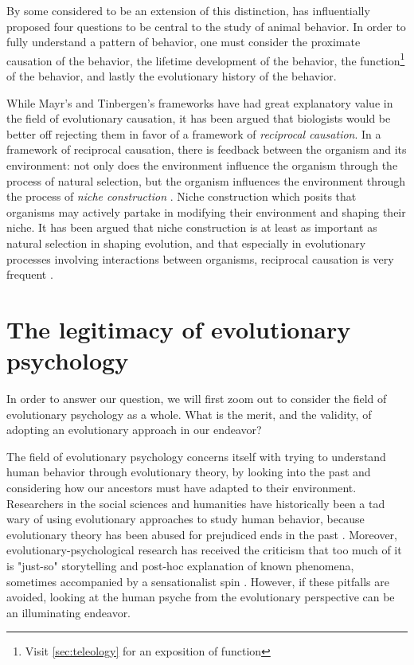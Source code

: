 By some considered to be an extension of this distinction, \cite{Tinbergen63} has influentially proposed four questions to be central to the study of animal behavior. In order to fully understand a pattern of behavior, one must consider the proximate causation of the behavior, the lifetime development of the behavior, the function\footnote{Visit \cref{sec:teleology} for an exposition of function} of the behavior, and lastly the evolutionary history of the behavior.

While Mayr's and Tinbergen's frameworks have had great explanatory value in the field of evolutionary causation, it has been argued \citep{Laland13} that biologists would be better off rejecting them in favor of a framework of \emph{reciprocal causation}.
In a framework of reciprocal causation, there is feedback between the organism and its environment: not only does the environment influence the organism through the process of natural selection, but the organism influences the environment through the process of \emph{niche construction} \citep{Svensson18}.
Niche construction which posits that organisms may actively partake in modifying their environment and shaping their niche. It has been argued that niche construction is at least as important as natural selection in shaping evolution, and that especially in evolutionary processes involving interactions between organisms, reciprocal causation is very frequent \citep{Svensson18}.

\section{The legitimacy of evolutionary psychology}

In order to answer our question, we will first zoom out to consider the field of evolutionary psychology as a whole. What is the merit, and the validity, of adopting an evolutionary approach in our endeavor?

The field of evolutionary psychology concerns itself with trying to understand human behavior through evolutionary theory, by looking into the past and considering how our ancestors must have adapted to their environment.
Researchers in the social sciences and humanities have historically been a tad wary of using evolutionary approaches to study human behavior, because evolutionary theory has been abused for prejudiced ends in the past \citep[pp.~19--20]{LB02}. Moreover, evolutionary-psychological research has received the criticism that too much of it is "just-so" storytelling and post-hoc explanation of known phenomena, sometimes accompanied by a sensationalist spin \citep{LB02}.
However, if these pitfalls are avoided, looking at the human psyche from the evolutionary perspective can be an illuminating endeavor.

